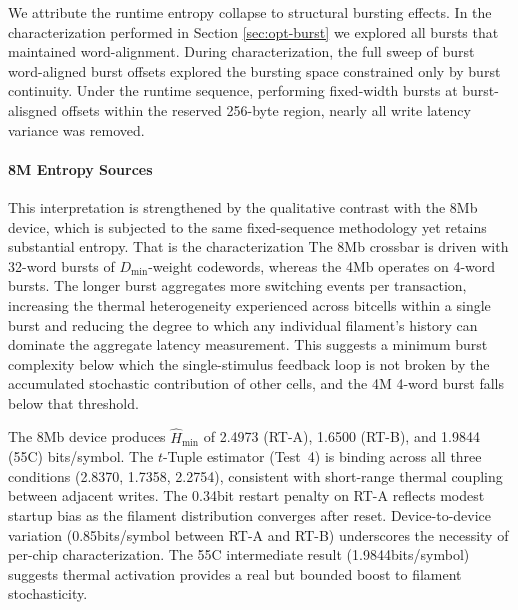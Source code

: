 We attribute the runtime entropy collapse to structural bursting effects. In the characterization performed in Section \ref{sec:opt-burst} we explored all bursts that maintained word-alignment. During characterization, the full sweep of burst word-aligned burst offsets explored the bursting space constrained only by burst continuity. Under the runtime sequence, performing fixed-width bursts at burst-alisgned offsets within the reserved 256-byte region, nearly all write latency variance was removed.

\paragraph{8M Entropy Sources}
This interpretation is strengthened by the qualitative contrast with the 8Mb device, which is subjected to the same fixed-sequence methodology yet retains substantial entropy. That is the characterization The 8Mb crossbar is driven with 32-word bursts of $D_{\min}$-weight codewords, whereas the 4Mb operates on 4-word bursts.  The longer burst aggregates more switching events per transaction, increasing the thermal heterogeneity experienced across bitcells within a single burst and reducing the degree to which any individual filament's history can dominate the aggregate latency measurement.  This suggests a minimum burst complexity below which the single-stimulus feedback loop is not broken by the accumulated stochastic contribution of other cells, and the 4M 4-word burst falls below that threshold.

The 8Mb device produces $\hat{H}_{\min}$ of 2.4973 (RT-A), 1.6500 (RT-B), and 1.9844 (55\textdegree{}C)  bits/symbol.  The $t$-Tuple estimator (Test~4) is binding across all three conditions (2.8370, 1.7358, 2.2754), consistent with short-range thermal coupling between adjacent writes.  The 0.34bit restart penalty on RT-A reflects modest startup bias as the filament distribution converges after reset. Device-to-device variation (0.85bits/symbol between RT-A and RT-B) underscores the necessity of per-chip characterization.  The 55\textdegree{}C intermediate result (1.9844bits/symbol) suggests thermal activation provides a real but bounded boost to filament stochasticity.




